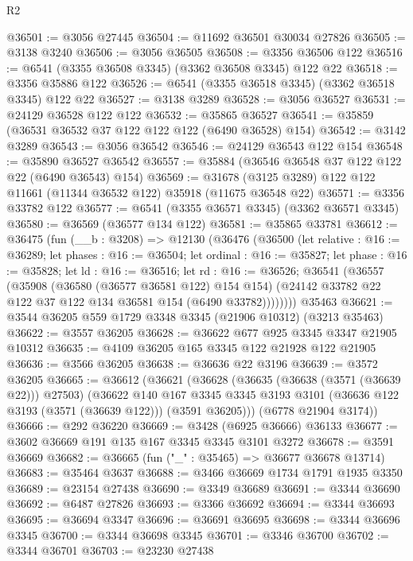 \begin{lexlean}{R2}
\begin{coremodule}
@36501 := @3056 @27445
@36504 := @11692 @36501 @30034 @27826
@36505 := @3138 @3240
@36506 := @3056 @36505
@36508 := @3356 @36506 @122
@36516 := @6541 (@3355 @36508 @3345) (@3362 @36508 @3345) @122 @22
@36518 := @3356 @35886 @122
@36526 := @6541 (@3355 @36518 @3345) (@3362 @36518 @3345) @122 @22
@36527 := @3138 @3289
@36528 := @3056 @36527
@36531 := @24129 @36528 @122 @122
@36532 := @35865 @36527
@36541 := @35859 (@36531 @36532 @37 @122 @122 @122 (@6490 @36528) @154)
@36542 := @3142 @3289
@36543 := @3056 @36542
@36546 := @24129 @36543 @122 @154
@36548 := @35890 @36527 @36542
@36557 := @35884 (@36546 @36548 @37 @122 @122 @22 (@6490 @36543) @154)
@36569 := @31678 (@3125 @3289) @122 @122 @11661 (@11344 @36532 @122) @35918 (@11675 @36548 @22)
@36571 := @3356 @33782 @122
@36577 := @6541 (@3355 @36571 @3345) (@3362 @36571 @3345)
@36580 := @36569 (@36577 @134 @122)
@36581 := @35865 @33781
@36612 := @36475
    (fun (__b : @3208) =>
    @12130
      (@36476
        (@36500
          (let relative : @16 := @36289;
          let phases : @16 := @36504;
          let ordinal : @16 := @35827;
          let phase : @16 := @35828;
          let ld : @16 := @36516;
          let rd : @16 := @36526;
          @36541
            (@36557
              (@35908
                (@36580 (@36577 @36581 @122) @154 @154)
                (@24142 @33782 @22 @122 @37 @122 @134 @36581 @154 (@6490 @33782))))))))
    @35463
@36621 := @3544 @36205 @559 @1729 @3348 @3345 (@21906 @10312) (@3213 @35463)
@36622 := @3557 @36205
@36628 := @36622 @677 @925 @3345 @3347 @21905 @10312
@36635 := @4109 @36205 @165 @3345 @122 @21928 @122 @21905
@36636 := @3566 @36205
@36638 := @36636 @22 @3196
@36639 := @3572 @36205
@36665 := @36612
    (@36621
      (@36628
        (@36635 (@36638 (@3571 (@36639 @22))) @27503)
        (@36622
          @140
          @167
          @3345
          @3345
          @3193
          @3101
          (@36636 @122 @3193 (@3571 (@36639 @122)))
          (@3591 @36205)))
      (@6778 @21904 @3174))
@36666 := @292 @36220
@36669 := @3428 (@6925 @36666) @36133
@36677 := @3602 @36669 @191 @135 @167 @3345 @3345 @3101 @3272
@36678 := @3591 @36669
@36682 := @36665 (fun ("_" : @35465) => @36677 @36678 @13714)
@36683 := @35464 @3637
@36688 := @3466 @36669 @1734 @1791 @1935 @3350
@36689 := @23154 @27438
@36690 := @3349 @36689
@36691 := @3344 @36690
@36692 := @6487 @27826
@36693 := @3366 @36692
@36694 := @3344 @36693
@36695 := @36694 @3347
@36696 := @36691 @36695
@36698 := @3344 @36696 @3345
@36700 := @3344 @36698 @3345
@36701 := @3346 @36700
@36702 := @3344 @36701
@36703 := @23230 @27438

\end{coremodule}
\end{lexlean}
